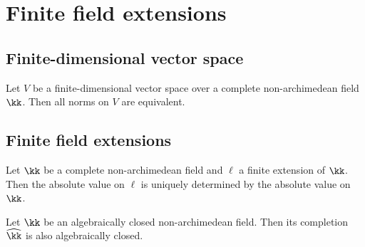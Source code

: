 \section{Finite field extensions}

\subsection{Finite-dimensional vector space}

    \begin{proposition}\label{prop:norm_on_finite_dimensional_vector_space_are_equivalent}
        Let \(V\) be a finite-dimensional vector space over a complete non-archimedean field \(\kk\).
        Then all norms on \(V\) are equivalent.
    \end{proposition}


\subsection{Finite field extensions}

    \begin{proposition}\label{prop:absolute_value_on_finite_extension_of_valuation_fields}
        Let \(\kk\) be a complete non-archimedean field and \(\ell\) a finite extension of \(\kk\).
        Then the absolute value on \(\ell\) is uniquely determined by the absolute value on \(\kk\).
    \end{proposition}

    \begin{proposition}\label{prop:completion_of_algebraically_closed_valuation_fields_is_algebraically_closed}
        Let \(\kk\) be an algebraically closed non-archimedean field.
        Then its completion \(\widehat{\kk}\) is also algebraically closed.
    \end{proposition}
